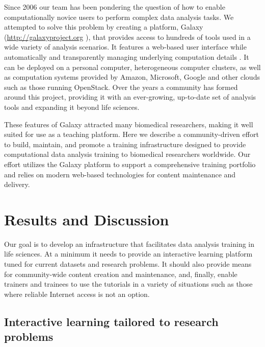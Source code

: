 Since 2006 our team has been pondering the question of how to enable computationally novice users to perform complex data analysis tasks. We attempted to solve this problem by creating a platform, Galaxy (\url{http://galaxyproject.org} \cite{afgan2016galaxy}), that provides access to hundreds of tools used in a wide variety of analysis scenarios. It features a web-based user interface while automatically and transparently managing underlying computation details \cite{afgan2016galaxy}. It can be deployed on a personal computer, heterogeneous computer clusters, as well as computation systems provided by Amazon, Microsoft, Google and other clouds such as those running OpenStack. Over the years a community has formed around this project, providing it with an ever-growing, up-to-date set of analysis tools and expanding it beyond life sciences.

These features of Galaxy attracted many biomedical researchers, making it well suited for use as a teaching platform. Here we describe a community-driven effort to build, maintain, and promote a training infrastructure designed to provide computational data analysis training to biomedical researchers worldwide. Our effort utilizes the Galaxy platform \cite{afgan2016galaxy} to support a comprehensive training portfolio and relies on modern web-based technologies for content maintenance and delivery.

\section*{Results and Discussion}
Our goal is to develop an infrastructure that facilitates data analysis training in life sciences. At a minimum it needs to provide an interactive learning platform tuned for current datasets and research problems. It should also provide means for community-wide content creation and maintenance, and, finally, enable trainers and trainees to use the tutorials in a variety of situations such as those where reliable Internet access is not an option.

\subsection*{Interactive learning tailored to research problems}


